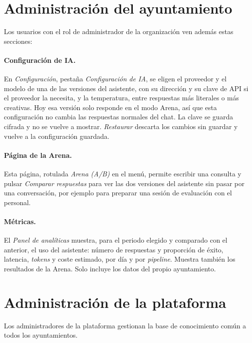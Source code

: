 \section{Administración del ayuntamiento}

Los usuarios con el rol de administrador de la organización ven además estas secciones:

\paragraph{Configuración de IA.} En \emph{Configuración}, pestaña \emph{Configuración de IA}, se eligen el proveedor y el modelo de una de las versiones del asistente, con su dirección y su clave de API si el proveedor la necesita, y la temperatura, entre respuestas más literales o más creativas. Hoy esa versión solo responde en el modo Arena, así que esta configuración no cambia las respuestas normales del chat. La clave se guarda cifrada y no se vuelve a mostrar. \emph{Restaurar} descarta los cambios sin guardar y vuelve a la configuración guardada.


\paragraph{Página de la Arena.} Esta página, rotulada \emph{Arena (A/B)} en el menú, permite escribir una consulta y pulsar \emph{Comparar respuestas} para ver las dos versiones del asistente sin pasar por una conversación, por ejemplo para preparar una sesión de evaluación con el personal.

\paragraph{Métricas.} El \emph{Panel de analíticas} muestra, para el periodo elegido y comparado con el anterior, el uso del asistente: número de respuestas y proporción de éxito, latencia, \emph{tokens} y coste estimado, por día y por \emph{pipeline}. Muestra también los resultados de la Arena. Solo incluye los datos del propio ayuntamiento.

\section{Administración de la plataforma}

Los administradores de la plataforma gestionan la base de conocimiento común a todos los ayuntamientos.

